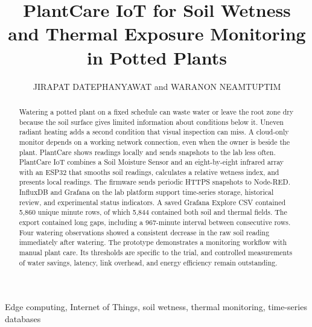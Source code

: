 \documentclass{ieeeaccess}
\begin{document}
\title{PlantCare IoT for Soil Wetness and Thermal Exposure Monitoring in Potted Plants}
\author{\uppercase{Jirapat Datephanyawat} and \uppercase{Waranon Neamtuptim}}
\address[1]{Student ID st125843, ICT Department, School of Engineering and Technology, Asian Institute of Technology, Pathum Thani, Thailand (e-mail: st125843@ait.asia)}
\address[2]{Student ID st125934, ICT Department, School of Engineering and Technology, Asian Institute of Technology, Pathum Thani, Thailand (e-mail: st125934@ait.asia)}

\begin{abstract}
Watering a potted plant on a fixed schedule can waste water or leave the root zone dry because the soil surface gives limited information about conditions below it. Uneven radiant heating adds a second condition that visual inspection can miss. A cloud-only monitor depends on a working network connection, even when the owner is beside the plant. PlantCare shows readings locally and sends snapshots to the lab less often. PlantCare IoT combines a Soil Moisture Sensor and an eight-by-eight infrared array with an ESP32 that smooths soil readings, calculates a relative wetness index, and presents local readings. The firmware sends periodic HTTPS snapshots to Node-RED. InfluxDB and Grafana on the lab platform support time-series storage, historical review, and experimental status indicators. A saved Grafana Explore CSV contained 5,860 unique minute rows, of which 5,844 contained both soil and thermal fields. The export contained long gaps, including a 967-minute interval between consecutive rows. Four watering observations showed a consistent decrease in the raw soil reading immediately after watering. The prototype demonstrates a monitoring workflow with manual plant care. Its thresholds are specific to the trial, and controlled measurements of water savings, latency, link overhead, and energy efficiency remain outstanding.
\end{abstract}

\begin{keywords}
Edge computing, Internet of Things, soil wetness, thermal monitoring, time-series databases
\end{keywords}
\titlepgskip=-21pt
\maketitle
\end{document}
